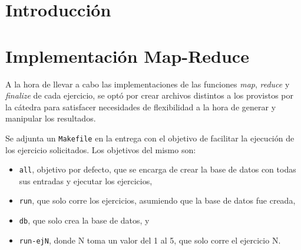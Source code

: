 \documentclass[a4paper]{article}
\begin{document}

\thispagestyle{empty}

\maketitle
\newpage

\thispagestyle{empty}
\vfill
\thispagestyle{empty}
\vspace{1.5cm}
\tableofcontents
\newpage


\newpage
\section{Introducción}


\newpage
\section{Implementación Map-Reduce}

A la hora de llevar a cabo las implementaciones de las funciones \textit{map},
\textit{reduce} y \textit{finalize} de cada ejercicio, se optó por crear
archivos distintos a los provistos por la cátedra para satisfacer necesidades
de flexibilidad a la hora de generar y manipular los resultados.

Se adjunta un \verb|Makefile| en la entrega con el objetivo de facilitar la
ejecución de los ejercicio solicitados. Los objetivos del mismo son:
\begin{itemize}
  \item \verb|all|, objetivo por defecto, que se encarga de crear la base de
  datos con todas sus entradas y ejecutar los ejercicios,
  \item \verb|run|, que solo corre los ejercicios, asumiendo que la base de
  datos fue creada,
  \item \verb|db|, que solo crea la base de datos, y
  \item \verb|run-ejN|, donde N toma un valor del 1 al 5, que solo corre el
  ejercicio N.
\end{itemize}
\end{document}
